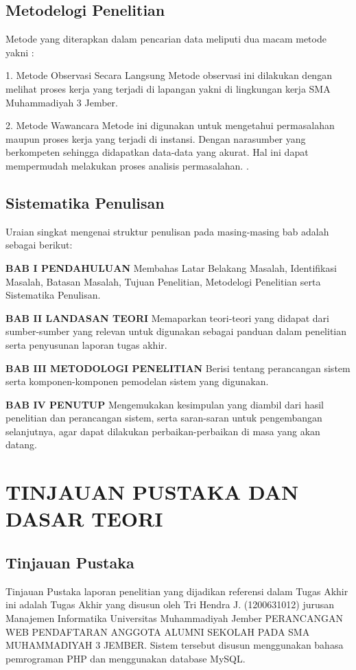 \documentclass{jtetiproposalskripsi}
\begin{document}
\section{Metodelogi Penelitian}
Metode yang diterapkan dalam pencarian data meliputi dua macam metode yakni :

1.	Metode Observasi Secara Langsung
Metode observasi ini dilakukan dengan melihat proses kerja yang terjadi di lapangan yakni di lingkungan kerja SMA Muhammadiyah 3 Jember.

2.	Metode Wawancara
Metode ini digunakan untuk mengetahui permasalahan maupun proses kerja yang terjadi di instansi. Dengan narasumber yang berkompeten sehingga didapatkan data-data yang akurat. Hal ini dapat mempermudah melakukan proses analisis permasalahan.
.

\section{Sistematika Penulisan}
Uraian singkat mengenai struktur penulisan pada masing-masing bab adalah sebagai berikut:

\textbf {BAB I PENDAHULUAN}
Membahas Latar Belakang Masalah, Identifikasi Masalah, Batasan Masalah, Tujuan Penelitian, Metodelogi Penelitian serta Sistematika Penulisan.

\textbf {BAB II LANDASAN TEORI}
Memaparkan teori-teori yang didapat dari sumber-sumber yang relevan untuk digunakan sebagai panduan dalam penelitian serta penyusunan laporan tugas akhir.

\textbf {BAB III METODOLOGI PENELITIAN}
Berisi tentang perancangan sistem serta komponen-komponen pemodelan sistem yang digunakan.

\textbf {BAB IV PENUTUP}
Mengemukakan kesimpulan yang diambil dari hasil penelitian dan perancangan sistem, serta saran-saran untuk pengembangan selanjutnya, agar dapat dilakukan perbaikan-perbaikan di masa yang akan datang.



\chapter{TINJAUAN PUSTAKA DAN DASAR TEORI}                

\section{Tinjauan Pustaka}
Tinjauan Pustaka laporan penelitian yang dijadikan referensi dalam Tugas Akhir ini adalah Tugas Akhir yang disusun oleh Tri Hendra J. (1200631012) jurusan Manajemen Informatika Universitas Muhammadiyah Jember PERANCANGAN WEB PENDAFTARAN ANGGOTA ALUMNI SEKOLAH PADA SMA MUHAMMADIYAH 3 JEMBER. Sistem tersebut disusun menggunakan bahasa pemrograman PHP  dan menggunakan database MySQL.
\end{document}

